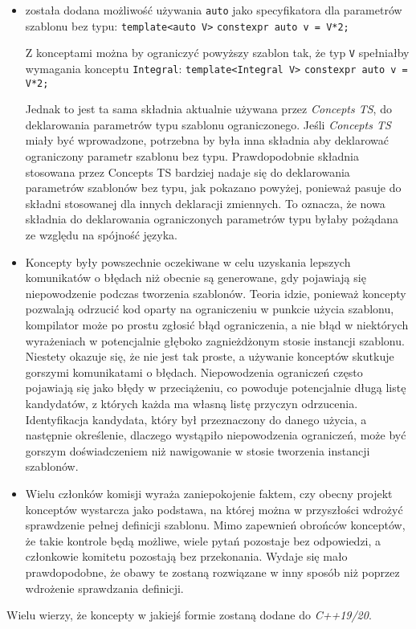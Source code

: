 \documentclass[11pt, a4paper]{article}
\begin{document}
\begin{itemize}
\item została dodana możliwość używania \verb#auto# jako specyfikatora dla parametrów szablonu bez typu: \newline\newline
\verb#template<auto V>#\newline
\verb#constexpr auto v = V*2;#\newline

Z konceptami można by ograniczyć powyższy szablon tak, że typ \verb#V# spełniałby wymagania konceptu \verb#Integral#:\newline
\verb#template<Integral V>#\newline
\verb#constexpr auto v = V*2;#\newline

Jednak to jest ta sama składnia aktualnie używana przez \emph{Concepts TS}, do deklarowania parametrów typu szablonu ograniczonego. Jeśli \emph{Concepts TS} miały być wprowadzone, potrzebna by była inna składnia aby deklarować ograniczony parametr szablonu bez typu. Prawdopodobnie składnia stosowana przez Concepts TS bardziej nadaje się do deklarowania parametrów szablonów bez typu, jak pokazano powyżej, ponieważ pasuje do składni stosowanej dla innych deklaracji zmiennych. To oznacza, że nowa składnia do deklarowania ograniczonych parametrów typu byłaby pożądana ze względu na spójność języka.

\item Koncepty były powszechnie oczekiwane w celu uzyskania lepszych komunikatów o błędach niż obecnie są generowane, gdy pojawiają się niepowodzenie podczas tworzenia szablonów. Teoria idzie, ponieważ koncepty pozwalają odrzucić kod oparty na ograniczeniu w punkcie użycia szablonu, kompilator może po prostu zgłosić błąd ograniczenia, a nie błąd w niektórych wyrażeniach w potencjalnie głęboko zagnieżdżonym stosie instancji szablonu. Niestety okazuje się, że nie jest tak proste, a używanie konceptów skutkuje gorszymi komunikatami o błędach. Niepowodzenia ograniczeń często pojawiają się jako błędy w przeciążeniu, co powoduje potencjalnie długą listę kandydatów, z których każda ma własną listę przyczyn odrzucenia. Identyfikacja kandydata, który był przeznaczony do danego użycia, a następnie określenie, dlaczego wystąpiło niepowodzenia ograniczeń, może być gorszym doświadczeniem niż nawigowanie w stosie tworzenia instancji szablonów.

\item Wielu członków komisji wyraża zaniepokojenie faktem, czy obecny projekt konceptów wystarcza jako podstawa, na której można w przyszłości wdrożyć sprawdzenie pełnej definicji szablonu. Mimo zapewnień obrońców konceptów, że takie kontrole będą możliwe, wiele pytań pozostaje bez odpowiedzi, a członkowie komitetu pozostają bez przekonania. Wydaje się mało prawdopodobne, że obawy te zostaną rozwiązane w inny sposób niż poprzez wdrożenie sprawdzania definicji.

\end{itemize}

Wielu wierzy, że koncepty w jakiejś formie zostaną dodane do \emph{C++19/20}.
\end{document}
